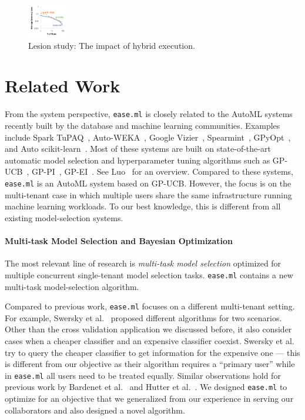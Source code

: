 \documentclass[letterpaper]{vldb}
\newcommand{\eml}{\texttt{ease.ml}\xspace}
\begin{document}
\begin{figure}[t!]
\centering
\includegraphics[width=0.15\textwidth]{figures/classifier_hybrid}
\vspace{-2em}
\caption{Lesion study: The impact of hybrid execution.}
\label{fig:hybrid-exec}
\vspace{-2em}
\end{figure}

\vspace{-1em}
\section{Related Work}\label{sec:relatedwork}

From the system perspective, \eml is closely related to the
AutoML systems recently built by the database and machine learning communities.
Examples include Spark TuPAQ~\cite{Sparks2015}, Auto-WEKA~\cite{Kotthoff2017,Thornton2013}, 
Google Vizier~\cite{Golovin2017}, Spearmint~\cite{Snoek2012}, GPyOpt~\cite{gpyopt2016},
and Auto scikit-learn~\cite{Feurer2015}. Most of these systems
are built on state-of-the-art automatic model selection and 
hyperparameter tuning algorithms such as GP-UCB~\cite{SrinivasKKS10},
GP-PI~\cite{Kushner1964}, GP-EI~\cite{SnoekLA12}.
See Luo~\cite{Luo16} for an overview.
Compared to these systems, \eml is an AutoML system based on GP-UCB. However, the focus is
on the multi-tenant case in which multiple users share the same
infrastructure running machine learning workloads. To our best knowledge,
this is different from all existing model-selection systems.

\vspace{-1em}
\paragraph*{Multi-task Model Selection and Bayesian Optimization} 
The most relevant line of research is {\em multi-task model selection}
optimized for multiple concurrent single-tenant model selection tasks.
\eml contains a new multi-task model-selection algorithm. 

Compared to previous work, \eml focuses
on a different multi-tenant setting. For example, Swersky et al.~\cite{Swersky2013}
proposed different algorithms for two scenarios. 
Other than the cross validation application we discussed before,
it also consider cases when a cheaper classifier and an expensive classifier coexist.
Swersky et al.
try to query the cheaper classifier to get information
for the expensive one --- this is different from our objective
as their algorithm requires a ``primary user'' while in \eml
all users need to be treated equally. Similar observations
hold for previous work by Bardenet et al.~\cite{Bardenet2013} and Hutter et al.~\cite{Hutter2011}.
We designed \eml to optimize for an objective
that we generalized from our experience in serving our collaborators
and also designed a novel algorithm. 
\end{document}
